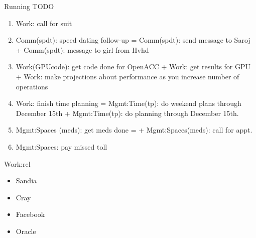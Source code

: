 \begin{frame}
\begin{columns}
\begin{column}{0.50\linewidth}
\begin{block}{Running TODO}
\begin{enumerate}
          Work:admin(scTr): figure out when and how to come back + 
          Work:admin(scTr): decide whether to do conference
          registration or not 


            
          



        \item \tiny Work: call for suit  

        \item \tiny Comm(spdt): speed dating follow-up  =
          Comm(spdt): send message to Saroj + Comm(spdt): message to
          girl from Hvhd 

        \item \tiny Work(GPUcode): get code done for OpenACC +
          Work: get results for GPU + Work: make projections about
          performance as you          increase number of operations 

        \item \tiny Work: finish time planning = Mgmt:Time(tp): do
          weekend plans through December 15th  + Mgmt:Time(tp): do
          planning through December 15th. 


        \item \tiny Mgmt:Spaces (meds): get meds done =
           +
          Mgmt:Spaces(meds): call for appt. 

        \item \tiny Mgmt:Spaces: pay missed toll  

        \end{enumerate}        
      \end{block} 
      
      \begin{block}{Work:rel}
        \begin{itemize} 
          
          \tiny \item \tiny Sandia 
        \item \tiny Cray  
        \item \tiny Facebook 
        \item \tiny Oracle  


\end{itemize}
\end{block}
\end{column}
\end{columns}
\end{frame}
